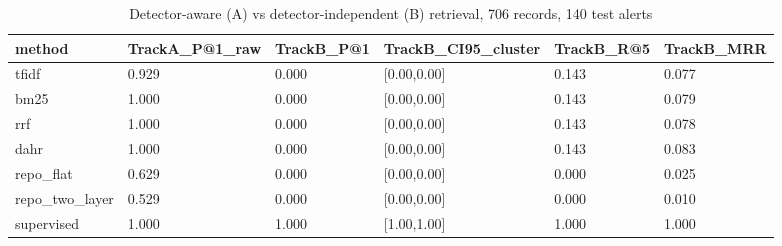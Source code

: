 \begin{table}[t]\centering\caption{Detector-aware (A) vs detector-independent (B) retrieval, 706 records, 140 test alerts}
\begin{tabular}{llllll}\hline
method & TrackA\_P@1\_raw & TrackB\_P@1 & TrackB\_CI95\_cluster & TrackB\_R@5 & TrackB\_MRR \\\hline
tfidf & 0.929 & 0.000 & [0.00,0.00] & 0.143 & 0.077 \\
bm25 & 1.000 & 0.000 & [0.00,0.00] & 0.143 & 0.079 \\
rrf & 1.000 & 0.000 & [0.00,0.00] & 0.143 & 0.078 \\
dahr & 1.000 & 0.000 & [0.00,0.00] & 0.143 & 0.083 \\
repo\_flat & 0.629 & 0.000 & [0.00,0.00] & 0.000 & 0.025 \\
repo\_two\_layer & 0.529 & 0.000 & [0.00,0.00] & 0.000 & 0.010 \\
supervised & 1.000 & 1.000 & [1.00,1.00] & 1.000 & 1.000 \\
\hline\end{tabular}\end{table}
